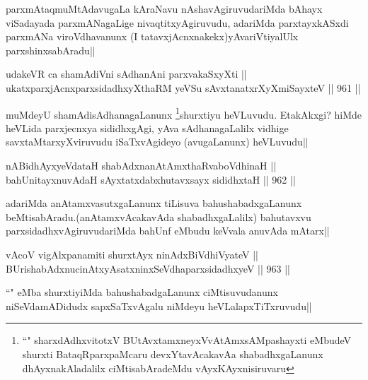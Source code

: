 \begin{artha}
parxmAtaqmuMtAdavugaLa kAraNavu nAshavAgiruvudariMda bAhayx viSadayada parxmANagaLige nivaqtitxyAgiruvudu, adariMda parxtayxkASxdi parxmANa viroVdhavanunx (I tatavxjAcnxnakekx)yAvariVtiyalUlx parxshinxsabAradu||
\end{artha}

\begin{shl}
udakeVR ca shamAdiVni sAdhanAni parxvakaSxyXti || \\
ukatxparxjAcnxparxsidadhxyXthaRM yeVSu sAvxtanatxrXyXmiSayxteV ||  961 ||  
\end{shl}

\begin{artha}
muMdeyU shamAdisAdhanagaLanunx \footnote{``\stext" sharxdAdhxvitotxV BUtAvx\s\s tamxneyxVvA\s\s tAmxsAMpashayxti eMbudeV shurxti BataqRparxpaMcaru devxYtavAcakavAa shabadhxgaLanunx dhAyxnakAladalilx ciMtisabAradeMdu vAyxKAyxnisiruvaru}shurxtiyu heVLuvudu. EtakAkxgi? hiMde heVLida parxjecnxya sididhxgAgi, yAva sAdhanagaLalilx vidhige savxtaMtarxyXviruvudu iSaTxvAgideyo (avugaLanunx) heVLuvudu||
\end{artha}


\begin{shl}
nABidhAyxyeVdataH shabAdxnanAtAmxthaRvaboVdhinaH || \\
bahUnitayxnuvAdaH sAyxtatxdabxhutavxsayx sididhxtaH ||  962 || 
\end{shl}

\begin{artha}
adariMda anAtamxvasutxgaLanunx tiLisuva bahushabadxgaLanunx beMtisabAradu.(anAtamxvAcakavAda shabadhxgaLalilx) bahutavxvu parxsidadhxvAgiruvudariMda bahUnf eMbudu keVvala anuvAda mAtarx||
\end{artha}

\begin{shl}
vAcoV vigAlxpanamiti shurxtAyx ninAdx\s BiVdhiVyateV ||  \\
BUrishabAdxnucinAtxyAsatxninxSeVdhaparxsidadhxyeV ||  963 ||  
\end{shl}

\begin{artha}
``\stext" eMba shurxtiyiMda bahushabadgaLanunx ciMtisuvudanunx niSeVdamADidudx sapxSaTxvAgalu niMdeyu heVLalapxTiTxruvudu||
\end{artha}


